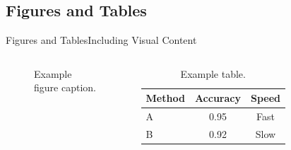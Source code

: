 \documentclass[
11pt,hyperref={pdfauthor=whatever}
]{beamer}
\begin{document}
\subsection{Figures and Tables}
\begin{frame}{Figures and Tables}{Including Visual Content}
\begin{columns}[T,onlytextwidth]
    \begin{figure}
        \centering
        \caption{Example figure caption.}
    \end{figure}

    \begin{table}
        \centering
        \begin{tabular}{lcc}
            \toprule
            Method & Accuracy & Speed \\
            \midrule
            A & 0.95 & Fast \\
            B & 0.92 & Slow \\
            \bottomrule
        \end{tabular}
        \caption{Example table.}
    \end{table}
\end{columns}
\end{frame}
\end{document}
